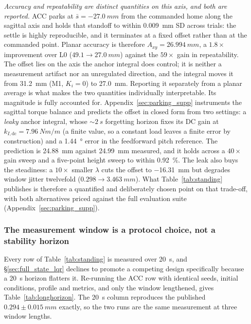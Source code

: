 \documentclass[conference]{IEEEtran}
\begin{document}
\emph{Accuracy and repeatability are distinct quantities on this axis, and both
are reported.} ACC parks at $\bar{s}={-}\SI{27.0}{mm}$ from the commanded home
along the sagittal axis and holds that standoff to within \SI{0.009}{mm} SD
across trials: the settle is highly reproducible, and it terminates at a fixed
offset rather than at the commanded point. Planar accuracy is therefore
$A_{xy}=\SI{26.994}{mm}$, a $1.8{\times}$ improvement over L0
($49.1\rightarrow\SI{27.0}{mm}$) against the $59{\times}$ gain in repeatability.
The offset lies on the axis the anchor integral does control; it is neither a measurement artifact nor an unregulated direction, and the integral moves it
from \SI{31.2}{mm} (M1, $K_i{=}0$) to \SI{27.0}{mm}. Reporting it separately
from a planar average is what makes the two quantities individually
interpretable.
Its magnitude is fully accounted for. Appendix~\ref{sec:parking_supp}
instruments the sagittal torque balance and predicts the offset in closed form
from two settings: a \emph{leaky} anchor integral, whose ${\sim}\SI{2}{s}$
forgetting horizon fixes its DC gain at
$k_{I,\text{dc}}{=}\SI{7.96}{Nm/m}$ (a finite value, so a constant load leaves
a finite error by construction) and a \SI{1.44}{\degree} error in the
feedforward pitch reference. The prediction is \SI{24.88}{mm} against
\SI{24.99}{mm} measured, and it holds across a $40{\times}$ gain sweep and a
five-point height sweep to within \SI{0.92}{\percent}. The leak also buys the
steadiness: a $10{\times}$ smaller $\lambda$ cuts the offset to \SI{-16.31}{mm}
but degrades window jitter twelvefold ($0.298\rightarrow\SI{3.463}{mm}$). What
Table~\ref{tab:standing} publishes is therefore a quantified and deliberately
chosen point on that trade-off, with both alternatives priced against the full
evaluation suite (Appendix~\ref{sec:parking_supp}).

\subsubsection{The measurement window is a protocol choice, not a stability horizon}
\label{sec:longhorizon}

Every row of Table~\ref{tab:standing} is measured over \SI{20}{s}, and
\S\ref{sec:full_state_lqr} declines to promote a competing design specifically
because a \SI{20}{s} horizon flatters it. Re-running the ACC row with identical seeds, initial conditions, profile and metrics, and only the window lengthened, gives
Table~\ref{tab:longhorizon}. The \SI{20}{s} column reproduces the published
$0.294{\pm}\SI{0.015}{mm}$ exactly, so the two runs are the same measurement
at three window lengths.
\end{document}
